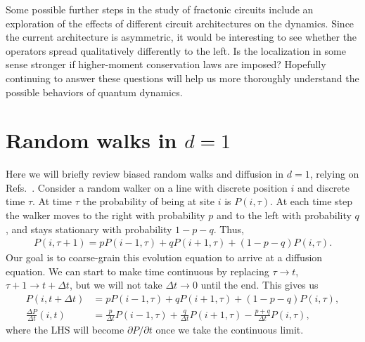 \documentclass[a4paper,11pt]{article}
\renewcommand{\t}{\tau}
\newcommand{\nn}{\nonumber\\}
\begin{document}
Some possible further steps in the study of fractonic circuits include an exploration of the effects of different circuit architectures on the dynamics. Since the current architecture is asymmetric, it would be interesting to see whether the operators spread qualitatively differently to the left. Is the localization in some sense stronger if higher-moment conservation laws are imposed? Hopefully continuing to answer these questions will help us more thoroughly understand the possible behaviors of quantum dynamics.


\nocite{apsrev41Control}


\appendix


\section{Random walks in $d=1$} \label{sec:walks}

Here we will briefly review biased random walks and diffusion in $d=1$, relying on Refs.~\cite{RoussellStatMech, MarenduAsp}. Consider a random walker on a line with discrete position $i$ and discrete time $\t$. At time $\t$ the probability of being at site $i$ is $P(i,\t)$. At each time step the walker moves to the right with probability $p$ and to the left with probability $q$, and stays stationary with probability $1-p-q$. Thus,
\begin{align}
P(i,\t+1) = pP(i-1,\t)+qP(i+1,\t)+(1-p-q)P(i,\t).
\end{align}
Our goal is to coarse-grain this evolution equation to arrive at a diffusion equation.
We can start to make time continuous by replacing $\t\to t$, $\t+1\to t+\Delta t$, but we will not take $\Delta t\to0$ until the end. This gives us
\begin{align}
P(i,t+\Delta t) &= pP(i-1,\t)+qP(i+1,\t)+(1-p-q)P(i,\t),\nn
\frac{\Delta P}{\Delta t}(i,t) &= \frac{p}{\Delta t} P(i-1,\t) + \frac{q}{\Delta t}P(i+1,\t)-\frac{p+q}{\Delta t}P(i,\t),
\end{align}
where the LHS will become $\partial P/\partial t$ once we take the continuous limit.
\end{document}
